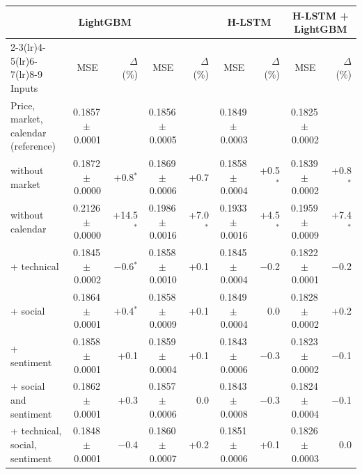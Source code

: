 \begin{tabular}{@{}lcrcrcrcr@{}}
\toprule
 & \multicolumn{2}{c}{LightGBM} & \multicolumn{2}{c}{\HQ{}} & \multicolumn{2}{c}{H-LSTM} & \multicolumn{2}{c}{H-LSTM + LightGBM} \\
\cmidrule(lr){2-3}\cmidrule(lr){4-5}\cmidrule(lr){6-7}\cmidrule(lr){8-9}
Inputs & MSE & $\Delta$ (\%) & MSE & $\Delta$ (\%) & MSE & $\Delta$ (\%) & MSE & $\Delta$ (\%) \\
\midrule
Price, market, calendar (reference) & 0.1857\,$\pm$\,0.0001 &  & 0.1856\,$\pm$\,0.0005 &  & 0.1849\,$\pm$\,0.0003 &  & 0.1825\,$\pm$\,0.0002 &  \\
\addlinespace[2pt]
\quad without market & 0.1872\,$\pm$\,0.0000 & +0.8$^{*}$ & 0.1869\,$\pm$\,0.0006 & +0.7 & 0.1858\,$\pm$\,0.0004 & +0.5$^{*}$ & 0.1839\,$\pm$\,0.0002 & +0.8$^{*}$ \\
\quad without calendar & 0.2126\,$\pm$\,0.0000 & +14.5$^{*}$ & 0.1986\,$\pm$\,0.0016 & +7.0$^{*}$ & 0.1933\,$\pm$\,0.0016 & +4.5$^{*}$ & 0.1959\,$\pm$\,0.0009 & +7.4$^{*}$ \\
\quad + technical & 0.1845\,$\pm$\,0.0002 & $-$0.6$^{*}$ & 0.1858\,$\pm$\,0.0010 & +0.1 & 0.1845\,$\pm$\,0.0004 & $-$0.2 & 0.1822\,$\pm$\,0.0001 & $-$0.2 \\
\quad + social & 0.1864\,$\pm$\,0.0001 & +0.4$^{*}$ & 0.1858\,$\pm$\,0.0009 & +0.1 & 0.1849\,$\pm$\,0.0004 & 0.0 & 0.1828\,$\pm$\,0.0002 & +0.2 \\
\quad + sentiment & 0.1858\,$\pm$\,0.0001 & +0.1 & 0.1859\,$\pm$\,0.0004 & +0.1 & 0.1843\,$\pm$\,0.0006 & $-$0.3 & 0.1823\,$\pm$\,0.0002 & $-$0.1 \\
\quad + social and sentiment & 0.1862\,$\pm$\,0.0001 & +0.3 & 0.1857\,$\pm$\,0.0006 & 0.0 & 0.1843\,$\pm$\,0.0008 & $-$0.3 & 0.1824\,$\pm$\,0.0004 & $-$0.1 \\
\quad + technical, social, sentiment & 0.1848\,$\pm$\,0.0001 & $-$0.4 & 0.1860\,$\pm$\,0.0007 & +0.2 & 0.1851\,$\pm$\,0.0006 & +0.1 & 0.1826\,$\pm$\,0.0003 & 0.0 \\
\bottomrule
\end{tabular}
